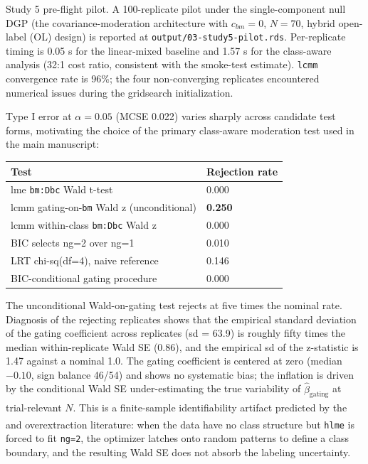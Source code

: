\documentclass[
  11pt,
]{article}
\newcounter{none} %
\begin{document}
Study 5 pre-flight pilot. A 100-replicate pilot under the
single-component null DGP (the covariance-moderation architecture with
\(c_{bm} = 0\), \(N = 70\), hybrid open-label (OL) design) is reported at
\texttt{output/03-study5-pilot.rds}. Per-replicate timing is 0.05 s
for the linear-mixed baseline and 1.57 s for the class-aware analysis
(32:1 cost ratio, consistent with the smoke-test estimate).
\texttt{lcmm} convergence rate is 96\%; the four non-converging
replicates encountered numerical issues during the gridsearch
initialization.

Type I error at \(\alpha = 0.05\) (MCSE 0.022)
varies sharply across candidate test forms, motivating the choice of
the primary class-aware moderation test used in the main manuscript:

{\def\LTcaptype{none} %
\begin{longtable}[]{@{}ll@{}}
\toprule\noalign{}
Test & Rejection rate \\
\midrule\noalign{}
\endhead
\bottomrule\noalign{}
\endlastfoot
lme \texttt{bm:Dbc} Wald t-test & 0.000 \\
lcmm gating-on-\texttt{bm} Wald z (unconditional) & \textbf{0.250} \\
lcmm within-class \texttt{bm:Dbc} Wald z & 0.000 \\
BIC selects ng=2 over ng=1 & 0.010 \\
LRT chi-sq(df=4), naive reference & 0.146 \\
BIC-conditional gating procedure & 0.000 \\
\end{longtable}
}

The unconditional Wald-on-gating test rejects at five times the nominal
rate. Diagnosis of the rejecting replicates shows that the empirical
standard deviation of the gating coefficient across replicates
(sd = 63.9) is roughly fifty times the median within-replicate Wald SE
(0.86), and the empirical sd of the z-statistic is 1.47 against a
nominal 1.0. The gating coefficient is centered at zero (median
\(-0.10\), sign balance 46/54) and shows no systematic bias; the
inflation is driven by the conditional Wald SE under-estimating the
true variability of \(\hat{\beta}_{\text{gating}}\) at trial-relevant
\(N\). This is a finite-sample identifiability artifact predicted by the\textsuperscript{} and\textsuperscript{} overextraction literature: when
the data have no class structure but \texttt{hlme} is forced to fit
\texttt{ng=2}, the optimizer latches onto random patterns to define a
class boundary, and the resulting Wald SE does not absorb the labeling
uncertainty.
\end{document}
